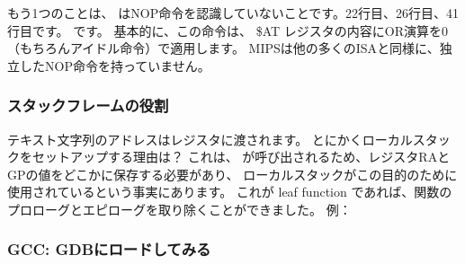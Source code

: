 
もう1つのことは、 \IDA は\ac{NOP}命令を認識していないことです。22行目、26行目、41行目です。
です。 基本的に、この命令は、 \$AT レジスタの内容にOR演算を0（もちろんアイドル命令）で適用します。 
MIPSは他の多くの\ac{ISA}と同様に、独立した\ac{NOP}命令を持っていません。

\subsubsection{スタックフレームの役割}

テキスト文字列のアドレスはレジスタに渡されます。 
とにかくローカルスタックをセットアップする理由は？ 
これは、 \printf が呼び出されるため、レジスタ\ac{RA}とGPの値をどこかに保存する必要があり、
ローカルスタックがこの目的のために使用されているという事実にあります。 
これが \gls{leaf function} であれば、関数のプロローグとエピローグを取り除くことができました。
例：

\subsubsection{\Optimizing GCC: GDBにロードしてみる}



